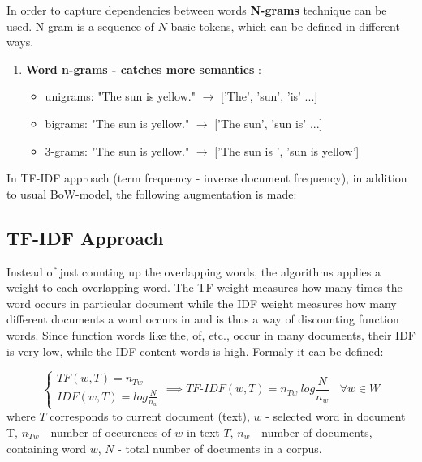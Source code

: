 In order to capture dependencies between words \textbf{N-grams} technique can be used. N-gram is a sequence of $N$ basic tokens, which can be defined in different ways. 

\begin{enumerate}
	\item \textbf{Word n-grams - catches more semantics} :
	\begin{itemize}
		\item unigrams: "The sun is yellow." $\rightarrow$ ['The', 'sun', 'is' ...]
		\item bigrams: "The sun is yellow." $\rightarrow$
		['The sun', 'sun is' ...]
		\item 3-grams: "The sun is yellow." $\rightarrow$
		['The sun is ', 'sun is yellow']
	\end{itemize}
\end{enumerate}

In TF-IDF approach (term frequency - inverse document frequency), in addition to usual BoW-model, the following augmentation is made:

\subsection{TF-IDF  Approach} \label{subsect2_1_2}
Instead of just counting up the overlapping words, the algorithms applies a weight to each overlapping word. The TF weight measures how many times the word occurs in particular document while the IDF weight measures how many different documents a word occurs in and is thus a way of discounting function words. Since function words like the, of, etc., occur in many documents, their IDF is very low, while the IDF content words is high.\cite[p.647]{jurafsky} Formaly it can be defined: 



\begin{equation}
\label{eq:equation2_2}
\begin{cases} TF(w,T)=n_{Tw} \\ IDF(w, T)= log{\frac{N}{n_{w}}}\end{cases} \implies
TF\text{-}IDF(w, T) = n_{Tw}\ log{\frac{N}{n_{w}}} \ \ \ \ \forall w \in W
\end{equation}
\hfill \break 
where $T$ corresponds to current document (text), \hfill \break 
$w$ - selected word in document T, \hfill \break
$n_{Tw}$ - number of occurences of $w$ in text $T$, \hfill \break
$n_{w}$ - number of documents, containing word $w$, \hfill \break
$N$ - total number of documents in a corpus.

